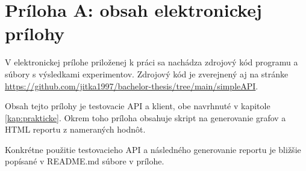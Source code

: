 \chapter*{Príloha A: obsah elektronickej prílohy}

V elektronickej prílohe priloženej k práci sa nachádza zdrojový kód
programu a súbory s výsledkami experimentov. Zdrojový kód je
zverejnený aj na stránke \url{https://github.com/jitka1997/bachelor-thesis/tree/main/simpleAPI}.

Obsah tejto prílohy je testovacie API a klient, obe navrhnuté v kapitole \ref{kap:prakticke}. Okrem toho príloha obsahuje skript na generovanie grafov a HTML reportu z nameraných hodnôt.

Konkrétne použitie testovacieho API a následného generovanie reportu je bližšie popísané v README.md súbore v prílohe.
